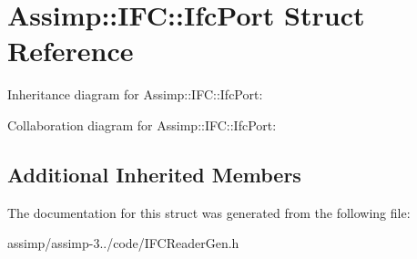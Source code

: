 \hypertarget{struct_assimp_1_1_i_f_c_1_1_ifc_port}{\section{Assimp\+:\+:I\+F\+C\+:\+:Ifc\+Port Struct Reference}
\label{struct_assimp_1_1_i_f_c_1_1_ifc_port}
}


Inheritance diagram for Assimp\+:\+:I\+F\+C\+:\+:Ifc\+Port\+:


Collaboration diagram for Assimp\+:\+:I\+F\+C\+:\+:Ifc\+Port\+:
\subsection*{Additional Inherited Members}


The documentation for this struct was generated from the following file\+:\begin{DoxyCompactItemize}
\item 
assimp/assimp-\/3../code/I\+F\+C\+Reader\+Gen.\+h\end{DoxyCompactItemize}
